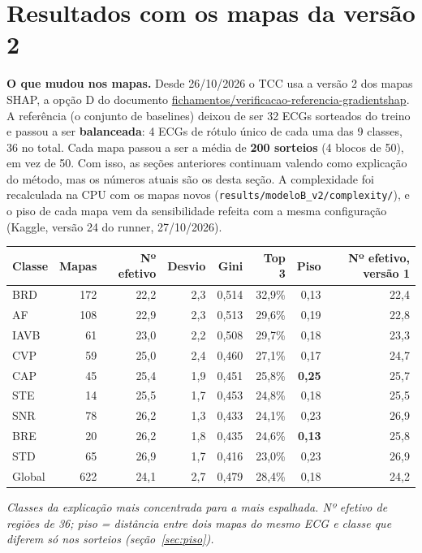 \documentclass[11pt,a4paper]{article}
\begin{document}
\section{Resultados com os mapas da versão 2}\label{sec:v2}
\textbf{O que mudou nos mapas.} Desde 26/10/2026 o TCC usa a versão 2 dos mapas SHAP, a opção D do documento \url{fichamentos/verificacao-referencia-gradientshap}. A referência (o conjunto de baselines) deixou de ser 32 ECGs sorteados do treino e passou a ser \textbf{balanceada}: 4 ECGs de rótulo único de cada uma das 9 classes, 36 no total. Cada mapa passou a ser a média de \textbf{200 sorteios} (4 blocos de 50), em vez de 50. Com isso, as seções anteriores continuam valendo como explicação do método, mas os números atuais são os desta seção. A complexidade foi recalculada na CPU com os mapas novos (\texttt{results/modeloB\_v2/complexity/}), e o piso de cada mapa vem da sensibilidade refeita com a mesma configuração (Kaggle, versão 24 do runner, 27/10/2026).

\begin{center}\small
\begin{tabularx}{\linewidth}{Xrrrrrrr}
\toprule
\textbf{Classe} & \textbf{Mapas} & \textbf{Nº efetivo} & \textbf{Desvio} & \textbf{Gini} & \textbf{Top 3} & \textbf{Piso} & \textbf{Nº efetivo, versão 1} \\
\midrule
BRD  & 172 & 22,2 & 2,3 & 0,514 & 32,9\% & 0,13 & 22,4 \\
AF   & 108 & 22,9 & 2,3 & 0,513 & 29,6\% & 0,19 & 22,8 \\
IAVB &  61 & 23,0 & 2,2 & 0,508 & 29,7\% & 0,18 & 23,3 \\
CVP  &  59 & 25,0 & 2,4 & 0,460 & 27,1\% & 0,17 & 24,7 \\
CAP  &  45 & 25,4 & 1,9 & 0,451 & 25,8\% & \textbf{0,25} & 25,7 \\
STE  &  14 & 25,5 & 1,7 & 0,453 & 24,8\% & 0,18 & 25,5 \\
SNR  &  78 & 26,2 & 1,3 & 0,433 & 24,1\% & 0,23 & 26,9 \\
BRE  &  20 & 26,2 & 1,8 & 0,435 & 24,6\% & \textbf{0,13} & 25,8 \\
STD  &  65 & 26,9 & 1,7 & 0,416 & 23,0\% & 0,23 & 26,9 \\
\midrule
Global & 622 & 24,1 & 2,7 & 0,479 & 28,4\% & 0,18 & 24,2 \\
\bottomrule
\end{tabularx}
\end{center}
\textit{Classes da explicação mais concentrada para a mais espalhada. Nº efetivo de regiões de 36; piso = distância entre dois mapas do mesmo ECG e classe que diferem só nos sorteios (seção~\ref{sec:piso}).}
\end{document}
